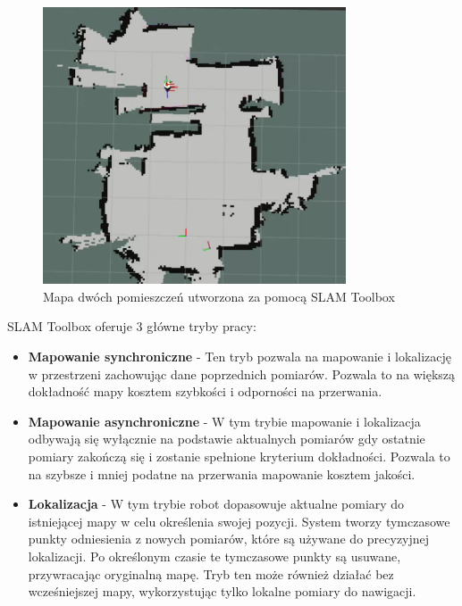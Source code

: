 \documentclass[a4paper,twoside,12pt]{book}
\begin{document}
\begin{figure}[h]
	\centering
	\includegraphics[width=0.8\textwidth]{images/sklep.png}
	\caption{Mapa dwóch pomieszczeń utworzona za pomocą SLAM Toolbox \cite{bib:slamtoolbox}}
	\label{fig:sklep}
	\end{figure}
\newpage
SLAM Toolbox oferuje 3 główne tryby pracy:
\begin{itemize}
	\item \textbf{Mapowanie synchroniczne} - Ten tryb pozwala na mapowanie i lokalizację w przestrzeni zachowując dane poprzednich pomiarów. Pozwala to na większą dokładność mapy kosztem szybkości i odporności na przerwania.
	\item \textbf{Mapowanie asynchroniczne} - W tym trybie mapowanie i lokalizacja odbywają się wyłącznie na podstawie aktualnych pomiarów gdy ostatnie pomiary zakończą się i zostanie spełnione kryterium dokładności. Pozwala to na szybsze i mniej podatne na przerwania mapowanie kosztem jakości.
	\item \textbf{Lokalizacja} - W tym trybie robot dopasowuje aktualne pomiary do istniejącej mapy w celu określenia swojej pozycji. System tworzy tymczasowe punkty odniesienia z nowych pomiarów, które są używane do precyzyjnej lokalizacji. Po określonym czasie te tymczasowe punkty są usuwane, przywracając oryginalną mapę. Tryb ten może również działać bez wcześniejszej mapy, wykorzystując tylko lokalne pomiary do nawigacji.
\end{itemize}

\newpage
\end{document}
